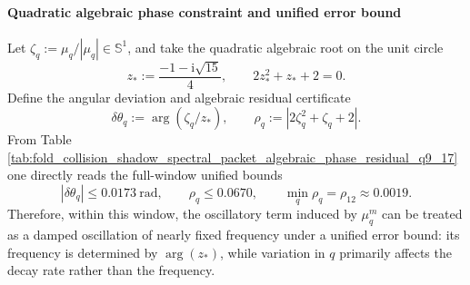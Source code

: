 \begin{remark}
\paragraph{Quadratic algebraic phase constraint and unified error bound}
Let \(\zeta_q:=\mu_q/|\mu_q|\in\mathbb{S}^1\), and take the quadratic algebraic root on the unit circle
\[
z_\ast:=\frac{-1-\mathrm{i}\sqrt{15}}{4},
\qquad
2z_\ast^{2}+z_\ast+2=0.
\]
Define the angular deviation and algebraic residual certificate
\[
\delta\theta_q:=\arg(\zeta_q/z_\ast),
\qquad
\rho_q:=|2\zeta_q^2+\zeta_q+2|.
\]
From Table \ref{tab:fold_collision_shadow_spectral_packet_algebraic_phase_residual_q9_17} one directly reads the full-window unified bounds
\[
|\delta\theta_q|\le 0.0173\ \mathrm{rad},
\qquad
\rho_q\le 0.0670,
\qquad
\min_q\rho_q=\rho_{12}\approx 0.0019.
\]
Therefore, within this window, the oscillatory term induced by \(\mu_q^m\) can be treated as a damped oscillation of nearly fixed frequency under a unified error bound: its frequency is determined by \(\arg(z_\ast)\), while variation in \(q\) primarily affects the decay rate rather than the frequency.
\par


\end{remark}
